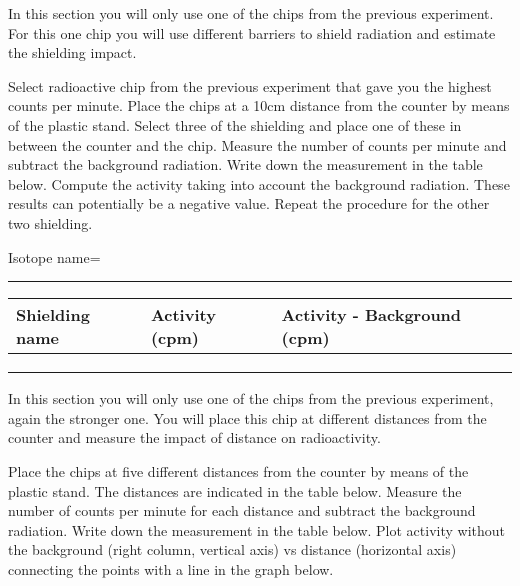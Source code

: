 \documentclass[main.tex]{subfiles}
\begin{document}
 
 \vspace{0.2cm}{\large \bfseries 3. Radioactivity protection}
In this section you will only use one of the chips from the previous experiment. For this one chip you will use different barriers to shield radiation and estimate the shielding impact.
\begin{steps}
    \newstep[] Select radioactive chip from the previous experiment that gave you the highest counts per minute.
        \newstep[]  Place the chips at a 10cm distance from the counter by means of the plastic stand. 
        \newstep[]  Select three of the shielding and place one of these in between the counter and the chip.
    \newstep[] Measure the number of counts per minute and subtract the background radiation.
   \newstep[] Write down the measurement in the table below. Compute the activity taking into account the background radiation. These results can potentially be a negative value.
       \newstep[] Repeat the procedure for the other two shielding.      
\end{steps}

\begin{center}Isotope name=\rule{5cm}{0.4pt}\end{center}
\begin{center}\begin{tabular}{ |p{3cm}|p{5cm}|p{5cm}|  }
\hline
    Shielding name &   Activity (cpm) &   Activity - Background (cpm)         \\
\hline
   \vspace{0cm}\vspace{.5cm} &     &            \\
\hline
   \vspace{0cm}\vspace{.5cm} &     &            \\
\hline
   \vspace{0cm}\vspace{.5cm} &     &            \\
\hline
\end{tabular}\end{center}



\vspace{0.2cm}{\large \bfseries 5. Effect of distance on radioactivity }
In this section you will only use one of the chips from the previous experiment, again the stronger one. You will place this chip at different distances from the counter and measure the impact of distance on radioactivity.
\begin{steps}
        \newstep[]  Place the chips at five different distances from the counter by means of the plastic stand. The distances are indicated in the table below.
    \newstep[] Measure the number of counts per minute for each distance and subtract the background radiation.
      \newstep[] Write down the measurement in the table below. 
            \newstep[] Plot activity without the background (right column, vertical axis) vs distance (horizontal axis) connecting the points with a line in the graph below. 

\end{steps}
\end{document}
